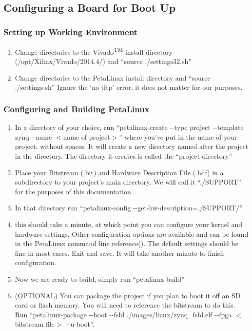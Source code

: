 \subsection{Configuring a Board for Boot Up}
\subsubsection{Setting up Working Environment}
\begin{enumerate}
\item Change directories to the Vivado\textsuperscript{TM} install directory (/opt/Xilinx/Vivado/2014.4/) and ``source ./settings32.sh''
\item Change directories to the PetaLinux install directory and ``source ./settings.sh''
\subitem Ignore the `no tftp' error, it does not matter for our purposes.
\end{enumerate}
\subsubsection{Configuring and Building PetaLinux}
\begin{enumerate}
\item In a directory of your choice, run ``petalinux-create -{}-type project -{}-template zynq -{}-name $<$name of project$>$'' where you've put in the name of your project, without spaces. It will create a new directory named after the project in the directory. The directory it creates is called the ``project directory''
\item Place your Bitstream (.bit) and Hardware Description File (.hdf) in a subdirectory to your  project's main directory. We will call it ``./SUPPORT'' for the purposes of this documentation.
\item In that directory run ``petalinux-config -{}-get-hw-description=./SUPPORT/''
\item this should take a minute, at which point you can configure your kernel and hardware settings. Other configuration options are available and can be found in the PetaLinux command line reference(\cite{commands}). The default settings should be fine in most cases. Exit and save. It will take another minute to finish configuration. 
\item Now we are ready to build, simply run ``petalinux-build''
\item (OPTIONAL) You can package the project if you plan to boot it off an SD card or flash memory. You will need to reference the bitstream to do this. 
\\Run \nohyphens{``petalinux-package -{}-boot -{}-fsbl ./images/linux/zynq\_fsbl.elf -{}-fpga $<$bitstream file$>$ -{}-u-boot''.}
\end{enumerate}
